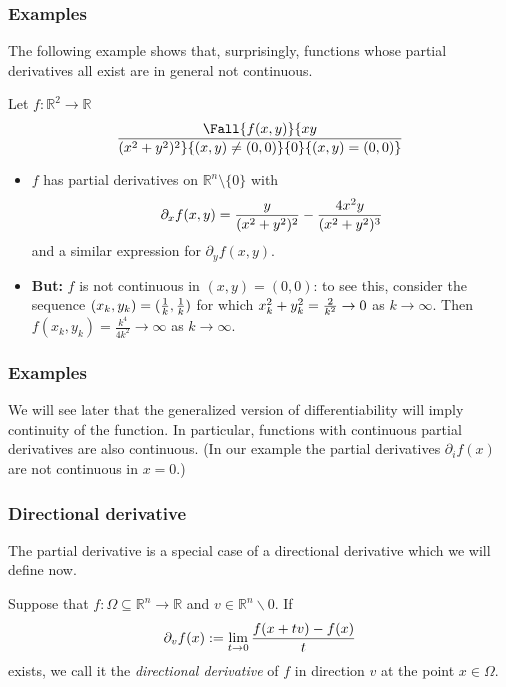  \begin{frame}[fragile] \frametitle{ Examples}
The following example shows that, surprisingly,  functions whose partial derivatives all exist  are in
general not continuous.

Let
  $f\colon \mathbb{R}^2 \rightarrow \mathbb{R}$ 
  \[
  \Fall{f(x,y) }{x y \over (x^2+y^2)^2}{(x,y) \not=(0,0)}{0}{(x,y)=(0,0)}
  \]
  \begin{itemize}
  \item $f$ has partial derivatives on $\mathbb{R}^n \setminus \{0\}$
  with
    \[\partial_x f(x,y) 
    = {y
      \over (x^2+y^2)^2} 
      - \frac{4 x^2y}{(x^2+y^2)^3}\]
    and a similar expression for $\partial_y f(x,y)$.

    \item
    {\bf But:} $f$ is not continuous in  $(x,y)=(0,0)$: to see this, consider the sequence
     $(x_k,y_k) = ({1 \over k},  {1 \over k})$ for which
     $x_k^2+y_k^2 = {2 \over k^2} \rightarrow 0$ 
    as $k \rightarrow \infty$.
   Then $f(x_k,y_k) = \frac{k^4}{ 4k^2} \to \infty$ 
    as $k \rightarrow \infty$.
  \end{itemize}
\end{frame}

 \begin{frame}[fragile] \frametitle{ Examples}

  We will see later that the generalized version of differentiability will imply continuity
  of the function. In particular, functions with continuous partial derivatives are also
  continuous. (In our example the partial derivatives $\partial_if(x)$ are not continuous in $x=0$.)


\end{frame}



 \begin{frame}[fragile] \frametitle{Directional derivative}

The partial derivative is a special case of a directional derivative which we will define now.



 Suppose that  
  $f\colon \Omega \subseteq \mathbb{R}^n \rightarrow \mathbb{R}$ and  $v \in \mathbb{R}^n \backslash {0}$.
  If 
  \[ \partial_v f(x) :=
   \lim_{t \rightarrow 0} {f(x+tv) - f(x) \over t} \]
  exists, we call it the 
   \emph{directional derivative } of  $f$ in direction $v$ at the point $x \in \Omega$.


\end{frame}

